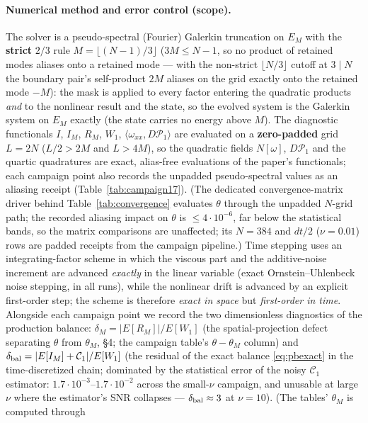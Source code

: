 \documentclass[11pt]{article}
\theoremstyle{remark}
\theoremstyle{plain}
\begin{document}
\paragraph{Numerical method and error control (scope).} The solver is a pseudo-spectral (Fourier)
Galerkin truncation on $E_M$ with the \textbf{strict} $2/3$ rule $M = \lfloor (N-1)/3\rfloor$
($3M \le N-1$, so no product of retained modes aliases onto a retained mode --- with the
non-strict $\lfloor N/3\rfloor$ cutoff at $3 \mid N$ the boundary pair's self-product $2M$
aliases on the grid exactly onto the retained mode $-M$): the mask is applied to every factor
entering the quadratic products \emph{and} to the nonlinear result and the state, so the evolved
system is the Galerkin system on $E_M$ exactly (the state carries no energy above $M$).
The diagnostic functionals $I$, $I_M$, $R_M$, $W_1$, $\langle\omega_{xx}, D\mathcal{P}_1\rangle$
are evaluated on a \textbf{zero-padded} grid $L = 2N$ ($L/2 > 2M$ and $L > 4M$), so the
quadratic fields $N[\omega]$, $D\mathcal{P}_1$ and the quartic quadratures are exact,
alias-free evaluations of the paper's functionals; each campaign point also records the
unpadded pseudo-spectral values as an aliasing receipt (Table~\ref{tab:campaign17}).
(The dedicated convergence-matrix driver behind Table~\ref{tab:convergence} evaluates
$\theta$ through the unpadded $N$-grid path; the recorded aliasing impact on $\theta$
is $\le 4\cdot10^{-6}$, far below the statistical bands, so the matrix comparisons are
unaffected; its $N{=}384$ and $dt/2$ ($\nu=0.01$) rows are padded receipts from the
campaign pipeline.) Time stepping uses an
integrating-factor scheme in which
the viscous part and the additive-noise increment are advanced
\emph{exactly} in the linear variable (exact Ornstein--Uhlenbeck noise stepping, in
all runs), while the nonlinear drift is advanced by an explicit
first-order step; the scheme is therefore \emph{exact in space} but
\emph{first-order in time}. Alongside each campaign point we record the two dimensionless
diagnostics of the production balance: $\delta_M = |E[R_M]|/E[W_1]$ (the spatial-projection
defect separating $\theta$ from $\theta_M$, \S4; the campaign table's $\theta-\theta_M$
column) and
$\delta_{\rm bal} = |E[I_M] + \mathcal{C}_1|/E[W_1]$ (the residual of the exact balance
\eqref{eq:pbexact} in the time-discretized chain; dominated by the statistical error of the
noisy $\mathcal{C}_1$ estimator: $1.7\cdot10^{-3}$--$1.7\cdot10^{-2}$ across the small-$\nu$
campaign, and unusable at large $\nu$ where the estimator's SNR collapses ---
$\delta_{\rm bal} \approx 3$ at $\nu = 10$). (The tables' $\theta_M$ is computed through
\end{document}
